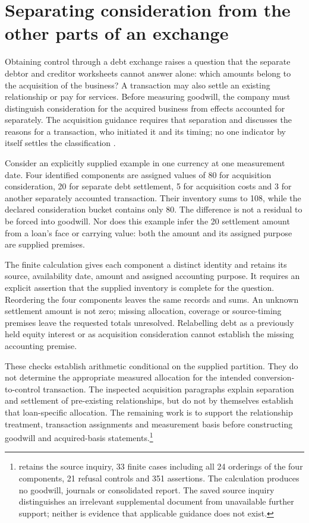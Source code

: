 \section{Separating consideration from the other parts of an exchange}
\label{sim:conversion-transaction-partition}

Obtaining control through a debt exchange raises a question that the separate debtor and creditor worksheets cannot answer alone: which amounts belong to the acquisition of the business? A transaction may also settle an existing relationship or pay for services. Before measuring goodwill, the company must distinguish consideration for the acquired business from effects accounted for separately. The acquisition guidance requires that separation and discusses the reasons for a transaction, who initiated it and its timing; no one indicator by itself settles the classification \citep[paras.~51--53 and B50--B53]{aasb3scope2026}.

Consider an explicitly supplied example in one currency at one measurement date. Four identified components are assigned values of 80 for acquisition consideration, 20 for separate debt settlement, 5 for acquisition costs and 3 for another separately accounted transaction. Their inventory sums to 108, while the declared consideration bucket contains only 80. The difference is not a residual to be forced into goodwill. Nor does this example infer the 20 settlement amount from a loan's face or carrying value: both the amount and its assigned purpose are supplied premises.

The finite calculation gives each component a distinct identity and retains its source, availability date, amount and assigned accounting purpose. It requires an explicit assertion that the supplied inventory is complete for the question. Reordering the four components leaves the same records and sums. An unknown settlement amount is not zero; missing allocation, coverage or source-timing premises leave the requested totals unresolved. Relabelling debt as a previously held equity interest or as acquisition consideration cannot establish the missing accounting premise.

These checks establish arithmetic conditional on the supplied partition. They do not determine the appropriate measured allocation for the intended conversion-to-control transaction. The inspected acquisition paragraphs explain separation and settlement of pre-existing relationships, but do not by themselves establish that loan-specific allocation. The remaining work is to support the relationship treatment, transaction assignments and measurement basis before constructing goodwill and acquired-basis statements.\footnote{ retains the source inquiry, 33 finite cases including all 24 orderings of the four components, 21 refusal controls and 351 assertions. The calculation produces no goodwill, journals or consolidated report. The saved source inquiry distinguishes an irrelevant supplemental document from unavailable further support; neither is evidence that applicable guidance does not exist.}

